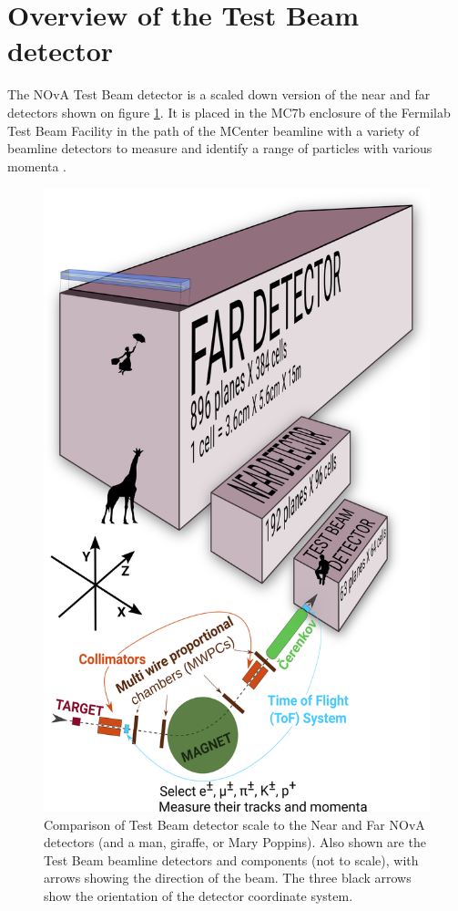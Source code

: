 \documentclass[12pt,a4paper]{article}
\begin{document}
\section{Overview of the Test Beam detector}\label{secTBDetector}

The NOvA Test Beam detector is a scaled down version of the near and far detectors shown on figure \ref{figTBDetector}. It is placed in the MC7b enclosure of the Fermilab Test Beam Facility in the path of the MCenter beamline with a variety of beamline detectors to measure and identify a range of particles with various momenta \cite{NOVA-doc-22172-v2}.

\begin{figure}[!ht]
\centering
\includegraphics[width=.7\textwidth]{Plots/TestBeamDetectorWithArrows.png}
\caption{Comparison of Test Beam detector scale to the Near and Far NOvA detectors (and a man, giraffe, or Mary Poppins). Also shown are the Test Beam beamline detectors and components (not to scale), with arrows showing the direction of the beam. The three black arrows show the orientation of the detector coordinate system.}
\label{figTBDetector}
\end{figure}
\end{document}

